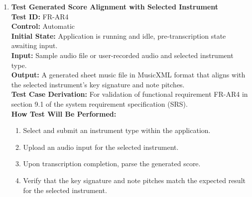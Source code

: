 \documentclass[12pt, titlepage]{article}
\begin{document}
\begin{enumerate}
  \item \textbf{Test Generated Score Alignment with Selected Instrument} \\
    \newline
    \textbf{Test ID:} FR-AR4 \\
    \textbf{Control:} Automatic \\
    \textbf{Initial State:} Application is running and idle, pre-transcription state awaiting input. \\
    \textbf{Input:} Sample audio file or user-recorded audio and selected instrument type. \\
    \textbf{Output:} A generated sheet music file in MusicXML format that aligns with the selected instrument’s key signature and note pitches. \\
    \textbf{Test Case Derivation:} For validation of functional requirement FR-AR4 in section 9.1 of the system requirement specification (SRS). \\
    \textbf{How Test Will Be Performed:}
    \begin{enumerate}
        \item Select and submit an instrument type within the application.
        \item Upload an audio input for the selected instrument.
        \item Upon transcription completion, parse the generated score.
        \item Verify that the key signature and note pitches match the expected result for the selected instrument.
    \end{enumerate}
  \end{enumerate}
\end{document}
